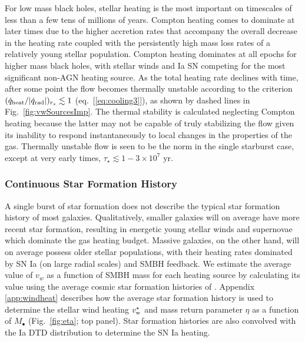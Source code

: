 \documentclass[usenatbib,fleqn]{mn2e}
\newcommand{\vwO}{v_{w}}
\begin{document}
For low mass black holes, stellar heating is the most important on timescales of less than a few tens of millions of years.  Compton heating comes to dominate at later times due to the higher accretion rates that accompany the overall decrease in the heating rate coupled with the persistently high mass loss rates of a relatively young stellar population.  Compton heating dominates at all epochs for higher mass black holes, with stellar winds and Ia SN competing for the most significant non-AGN heating source.  As the total heating rate declines with time, after some point the flow becomes thermally unstable according to the criterion $(\dot{q}_{\rm heat}/|\dot{q}_{\rm rad}|)_{r_{s}} \lesssim 1$ (eq.~[\ref{eq:cooling3}]), as shown by dashed lines in Fig.~\ref{fig:vwSourcesImp}.  The thermal stability is calculated neglecting Compton heating because the latter may not be capable of truly stabilizing the flow given its inability to respond instantaneously to local changes in the properties of the gas.  Thermally unstable flow is seen to be the norm in the single starburst case, except at very early times, $\tau_{\star} \lesssim 1-3 \times 10^7$ yr.

\subsubsection{Continuous Star Formation History}

A single burst of star formation does not describe the typical star formation history of most galaxies.  Qualitatively,
smaller galaxies will on average have more recent star formation, resulting in energetic young stellar winds and supernovae which dominate the gas heating budget.  Massive galaxies, on the other hand, will on average possess older stellar populations, with their heating rates dominated by SN Ia (on large radial scales) and SMBH feedback.  We estimate the average value of $\vwO$ as a function of SMBH mass for each heating source by calculating its value using the average cosmic star formation histories of \citet{MosterNaab+:2013a}.  Appendix \ref{app:windheat} describes how the average star formation history is used to determine the stellar wind heating $v_{\rm  w}^{\star}$ and mass return parameter $\eta$ as a function of $M_{\bullet}$ (Fig.~\ref{fig:eta}; top panel).  Star formation histories are also convolved with the Ia DTD distribution to determine the SN Ia heating.  
\end{document}
